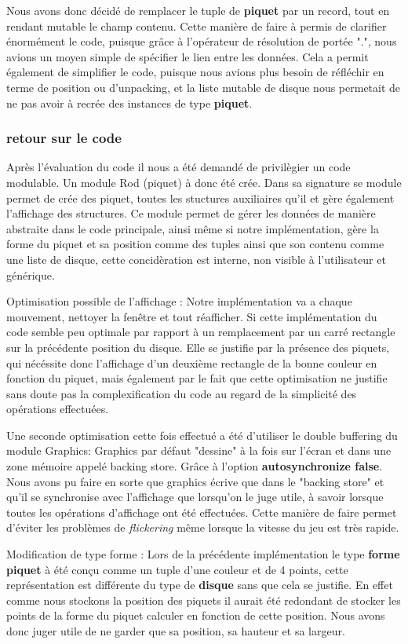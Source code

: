 \documentclass[a4paper,11pt]{article}
\begin{document}
Nous avons donc décidé de remplacer le tuple de \textbf{piquet} par un record, tout en rendant mutable le champ contenu.
Cette manière de faire à permis de clarifier énormément le code, puisque grâce à l'opérateur de résolution de portée ".", nous avions un moyen simple de spécifier le lien entre les données.
Cela a permit également de simplifier le code, puisque nous avions plus besoin de réfléchir en terme de position ou d'unpacking, et la liste mutable de disque nous permetait de ne pas avoir à recrée des instances de type \textbf{piquet}.


\subsubsection{retour sur le code}
Après l'évaluation du code il nous a été demandé de privilègier un code modulable.
Un module Rod (piquet) à donc été crée.
Dans sa signature se module permet de crée des piquet, toutes les stuctures auxiliaires qu'il 
et gère également l'affichage des structures.
Ce module permet de gérer les données de manière abstraite dans le code principale, ainsi même si notre implémentation, gère la forme du piquet et sa position comme des tuples ainsi que son contenu comme une liste de disque, cette concidèration est interne, non visible à l'utilisateur et générique.

Optimisation possible de l'affichage :
Notre implémentation va a chaque mouvement, nettoyer la fenêtre et tout réafficher.
Si cette implémentation du code semble peu optimale par rapport à un remplacement par un carré rectangle sur la précédente position du disque.
Elle se justifie par la présence des piquets, qui nécéssite donc l'affichage d'un deuxième rectangle de la bonne couleur en fonction du piquet, mais également par le fait que cette optimisation ne justifie sans doute pas la complexification du code au regard de la simplicité des opérations effectuées.

Une seconde optimisation cette fois effectué a été d'utiliser le double buffering du module Graphics:
Graphics par défaut "dessine" à la fois sur l'écran et dans une zone mémoire appelé backing store.
Grâce à l'option \textbf{autosynchronize false}.
Nous avons pu faire en sorte que graphics écrive que dans le "backing store" et qu'il se synchronise avec l'affichage que lorsqu'on le juge utile, à savoir lorsque toutes les opérations d'affichage ont été effectuées.
Cette manière de faire permet d'éviter les problèmes de \textit{flickering} même lorsque la vitesse du jeu est très rapide.

Modification de type forme :
Lors de la précédente implémentation le type \textbf{forme piquet} à été conçu comme un tuple d'une couleur et de 4 points, cette représentation est différente du type de \textbf{disque} sans que cela se justifie.
En effet comme nous stockons la position des piquets il aurait été redondant de stocker les points de la forme du piquet calculer en fonction de cette position.
Nous avons donc juger utile de ne garder que sa position, sa hauteur et sa largeur.
\end{document}
